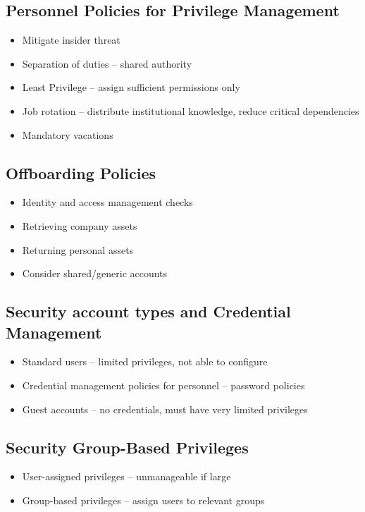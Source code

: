 	\subsection {Personnel Policies for Privilege Management}
		\begin{itemize}
			\item Mitigate insider threat
			\item Separation of duties -- shared authority
			\item Least Privilege -- assign sufficient permissions only
			\item Job rotation -- distribute institutional knowledge,
				reduce critical dependencies
			\item Mandatory vacations
		\end{itemize}
	\subsection {Offboarding Policies}
		\begin{itemize}
			\item Identity and access management checks
			\item Retrieving company assets
			\item Returning personal assets
			\item Consider shared/generic accounts
		\end{itemize}
	\subsection {Security account types and Credential Management}
		\begin{itemize}
			\item Standard users -- limited privileges, not able to configure
			\item Credential management policies for personnel -- password policies
			\item Guest accounts -- no credentials, must have very limited privileges
		\end{itemize}
	\subsection {Security Group-Based Privileges}
		\begin{itemize}
			\item User-assigned privileges -- unmanageable if large
			\item Group-based privileges -- assign users to relevant groups
		\end{itemize}
